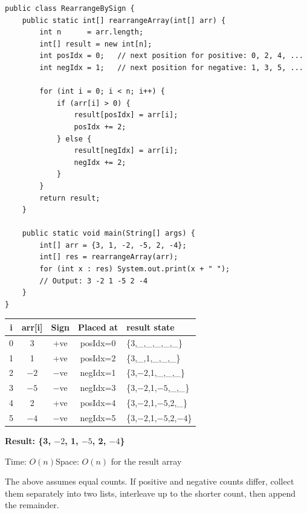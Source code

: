 \documentclass[12pt,a4paper,oneside]{book}
\begin{document}
\begin{lstlisting}[caption={Rearrange Alternating Positive and Negative}]
public class RearrangeBySign {
    public static int[] rearrangeArray(int[] arr) {
        int n      = arr.length;
        int[] result = new int[n];
        int posIdx = 0;   // next position for positive: 0, 2, 4, ...
        int negIdx = 1;   // next position for negative: 1, 3, 5, ...

        for (int i = 0; i < n; i++) {
            if (arr[i] > 0) {
                result[posIdx] = arr[i];
                posIdx += 2;
            } else {
                result[negIdx] = arr[i];
                negIdx += 2;
            }
        }
        return result;
    }

    public static void main(String[] args) {
        int[] arr = {3, 1, -2, -5, 2, -4};
        int[] res = rearrangeArray(arr);
        for (int x : res) System.out.print(x + " ");
        // Output: 3 -2 1 -5 2 -4
    }
}
\end{lstlisting}

\begin{dryrun}[Dry Run: arr = \{3, 1, $-2$, $-5$, 2, $-4$\}]
\begin{center}
\begin{tabular}{ccccl}
\toprule
\textbf{i} & \textbf{arr[i]} & \textbf{Sign} & \textbf{Placed at} & \textbf{result state}\\
\midrule
0 & 3    & +ve & posIdx=0 & \{3,\_,\_,\_,\_,\_\}\\
1 & 1    & +ve & posIdx=2 & \{3,\_,1,\_,\_,\_\}\\
2 & $-2$ & $-$ve & negIdx=1 & \{3,$-2$,1,\_,\_,\_\}\\
3 & $-5$ & $-$ve & negIdx=3 & \{3,$-2$,1,$-5$,\_,\_\}\\
4 & 2    & +ve & posIdx=4 & \{3,$-2$,1,$-5$,2,\_\}\\
5 & $-4$ & $-$ve & negIdx=5 & \{3,$-2$,1,$-5$,2,$-4$\}\\
\bottomrule
\end{tabular}
\end{center}
\textbf{Result: \{3, $-2$, 1, $-5$, 2, $-4$\}}
\end{dryrun}

\begin{complexity}
Time: $O(n)$\quad Space: $O(n)$ for the result array
\end{complexity}

\begin{warningbox}
The above assumes equal counts. If positive and negative counts differ, collect them separately into two lists, interleave up to the shorter count, then append the remainder.
\end{warningbox}
\end{document}
